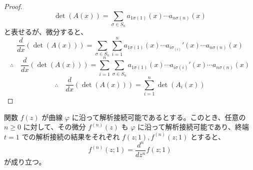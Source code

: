 \begin{proof}
    \[
    \det(A(x))=\sum_{\sigma\in S_{n}}a_{1\sigma(1)}(x)\cdots a_{n\sigma(n)}(x)
    \]
    と表せるが、微分すると、
    \[
    \frac{d}{dx}(\det(A(x)))=\sum_{\sigma\in S_{n}}\sum_{i=1}^{n}a_{1\sigma(1)}(x)\cdots a_{i\sigma_(i)}'(x)\cdots a_{n\sigma(n)}(x)
    \]
    \[
    \therefore\quad
    \frac{d}{dx}(\det(A(x)))=\sum_{i=1}^{n}\sum_{\sigma\in S_{n}}a_{1\sigma(1)}(x)\cdots a_{i\sigma(i)}'(x)\cdots a_{n\sigma(n)}(x)
    \]
    \[
    \therefore\quad
    \frac{d}{dx}(\det(A(x)))=\sum_{i=1}^{n}\det(A_{i}(x))
    \]
    
\end{proof}
\begin{proposition}[解析接続と微分は交換可能]\label{prop:interchange-ac-diff}
    関数 $f(z)$ が曲線 $\varphi$ に沿って解析接続可能であるとする。このとき、任意の$n\geq 0$ に対して、その微分 $f^{(n)}(z)$ も $\varphi$ に沿って解析接続可能であり、終端 $t=1$ での解析接続の結果をそれぞれ $f(z;1), f^{(n)}(z;1)$ とすると、
    \[
    f^{(n)}(z;1) = \frac{d^{n}}{dz^{n}}f(z;1)
    \]
    が成り立つ。
\end{proposition}

